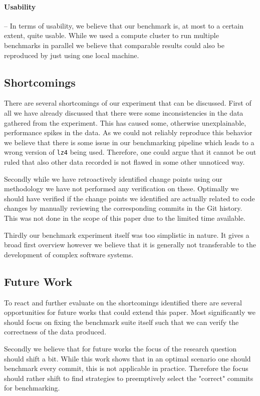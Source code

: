 \documentclass[	runningheads,
				a4paper]{llncs}
\begin{document}
\paragraph{Usability} -- In terms of usability, we believe that our benchmark is, at most to a certain extent, quite usable. While we used a compute cluster to run multiple benchmarks in parallel we believe that comparable results could also be reproduced by just using one local machine.

	\subsection{Shortcomings}
	\label{ssec:refl_shortcomings}
	There are several shortcomings of our experiment that can be discussed. First of all we have already discussed that there were some inconsistencies in the data gathered from the experiment. This has caused some, otherwise unexplainable, performance spikes in the data. As we could not reliably reproduce this behavior we believe that there is some issue in our benchmarking pipeline which leads to a wrong version of \texttt{lz4} being used. Therefore, one could argue that it cannot be out ruled that also other data recorded is not flawed in some other unnoticed way.

	Secondly while we have retroactively identified change points using our methodology we have not performed any verification on these. Optimally we should have verified if the change points we identified are actually related to code changes by manually reviewing the corresponding commits in the Git history. This was not done in the scope of this paper due to the limited time available.

	Thirdly our benchmark experiment itself was too simplistic in nature. It gives a broad first overview however we believe that it is generally not transferable to the development of complex software systems.

	\subsection{Future Work}

	To react and further evaluate on the shortcomings identified there are several opportunities for future works that could extend this paper. Most significantly we should focus on fixing the benchmark suite itself such that we can verify the correctness of the data produced.

	Secondly we believe that for future works the focus of the research question should shift a bit. While this work shows that in an optimal scenario one should benchmark every commit, this is not applicable in practice. Therefore the focus should rather shift to find strategies to preemptively select the "correct" commits for benchmarking.
\end{document}
